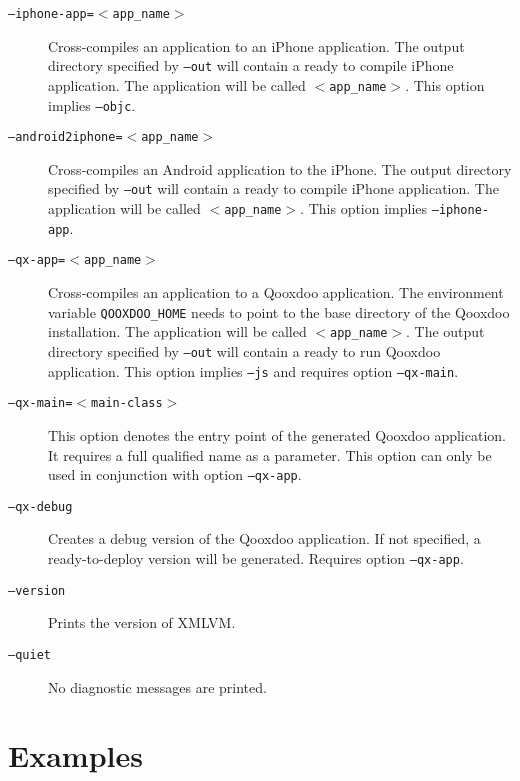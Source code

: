 \documentclass[12pt]{article}
\begin{document}
\begin{description}
\item[\texttt{--iphone-app=$<$app\_name$>$}] Cross-compiles an
  application to an iPhone application. The output directory specified
  by \texttt{--out} will contain a ready to compile iPhone
  application. The application will be called
  \texttt{$<$app\_name$>$}. This option implies \texttt{--objc}.

\item[\texttt{--android2iphone=$<$app\_name$>$}] Cross-compiles an
  Android application to the iPhone. The output directory specified by
  \texttt{--out} will contain a ready to compile iPhone application.
  The application will be called \texttt{$<$app\_name$>$}. This option
  implies \texttt{--iphone-app}.

\item[\texttt{--qx-app=$<$app\_name$>$}] Cross-compiles an application
  to a Qooxdoo application. The environment variable
  \texttt{QOOXDOO\_HOME} needs to point to the base directory of the
  Qooxdoo installation. The application will be called
  \texttt{$<$app\_name$>$}. The output directory specified by
  \texttt{--out} will contain a ready to run Qooxdoo application. This
  option implies \texttt{--js} and requires option \texttt{--qx-main}.

\item[\texttt{--qx-main=$<$main-class$>$}] This option denotes the
  entry point of the generated Qooxdoo application. It requires a full
  qualified name as a parameter. This option can only be used in
  conjunction with option \texttt{--qx-app}.

\item[\texttt{--qx-debug}] Creates a debug version of the Qooxdoo
  application.  If not specified, a ready-to-deploy version will be
  generated.  Requires option \texttt{--qx-app}.

\item[\texttt{--version}] Prints the version of XMLVM.

\item[\texttt{--quiet}] No diagnostic messages are printed.

\end{description}

\section{Examples}
\end{document}
